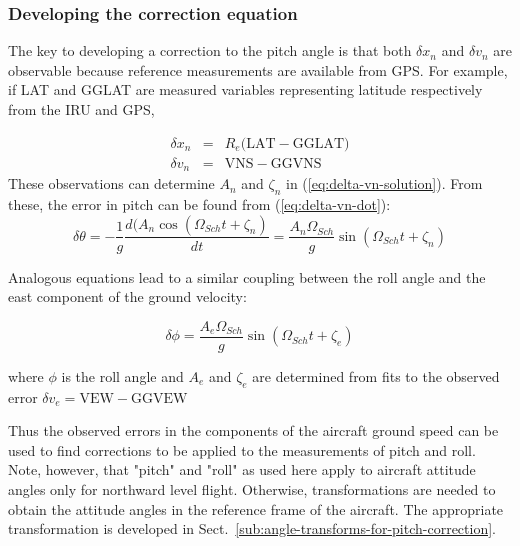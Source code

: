 \documentclass[12pt,twoside,english]{article}\usepackage[]{graphicx}\usepackage[]{color}
\let\OrgIndex\index
\renewcommand*{\index}[1]{\OrgIndex{#1}}
\begin{document}
{{\subsubsection{Developing the correction equation}

The key to developing a correction to the pitch angle is that both $\delta x_{n}$ and $\delta v_{n}$ are observable because reference measurements are available from GPS. For example, if LAT and GGLAT are measured variables representing latitude respectively from the IRU and GPS,

\begin{eqnarray}
\delta x_{n} & = & R_{e}(\mathrm{LAT-GGLAT)}\nonumber \\ 
\delta v_{n} & = & \mathrm{VNS-GGVNS}\label{eq:observed-errors} 
\end{eqnarray}
These observations can determine $A_{n}$ and $\zeta_{n}$ in (\ref{eq:delta-vn-solution}). From these, the error in pitch can be found from (\ref{eq:delta-vn-dot}):\\ 
\begin{equation}
\delta\theta=-\frac{1}{g}\frac{d(A_{n}\cos(\Omega_{Sch}t+\zeta_{n})}{dt}=\frac{A_{n}\Omega_{Sch}}{g}\sin(\Omega_{Sch}t+\zeta_{n})\label{eq:solution-delta-theta} 
\end{equation}


Analogous equations lead to a similar coupling between the roll angle and the east component of the ground velocity: 

\begin{equation}
\delta\phi=\frac{A_{e}\Omega_{Sch}}{g}\sin(\Omega_{Sch}t+\zeta_{e})\label{eq:solution-delta-phi} 
\end{equation}


where $\phi$ is the roll angle and $A_{e}$ and $\zeta_{e}$ are determined from fits to the observed error $\delta v_{e}=\mathrm{VEW-GGVEW}$


Thus the observed errors in the components of the aircraft ground  speed can be used to find corrections to be applied to the measurements of pitch and roll. Note, however, that "pitch" and "roll" as used here apply to aircraft attitude angles only for northward level flight. Otherwise, transformations are needed to obtain the attitude angles in the reference frame of the aircraft. The appropriate transformation is developed in Sect.~\ref{sub:angle-transforms-for-pitch-correction}.


}}
\end{document}
